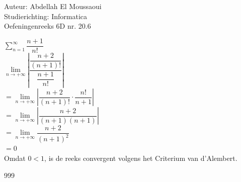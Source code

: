 \documentclass[a4paper]{article}
\begin{document}
  
\noindent \large Auteur: Abdellah El Moussaoui \\
\noindent \large Studierichting: Informatica\\
\noindent \large Oefeningenreeks 6D nr. 20.6\\

\medskip

\normalsize


$\displaystyle\sum_{n=1}^{\infty}\dfrac{n+1}{n!}$\\

$ \lim\limits_{n\to+\infty} \left| \dfrac{\dfrac{n+2}{\left(n+1\right)!}}{\dfrac{n+1}{n!}} \right| $\\

$= \lim\limits_{n\to+\infty} \left| \dfrac{n+2}{\left(n+1\right)!} \cdot \dfrac{n!}{n+1}\right|$\\

$= \lim\limits_{n\to+\infty} \left| \dfrac{n+2}{\left(n+1\right) \left(n+1\right)} \right| $\\

$= \lim\limits_{n\to+\infty} \dfrac{n+2}{\left(n+1\right)^2}$\\

$= 0$\\

Omdat $0 < 1$, is de reeks convergent volgens het Criterium van d'Alembert.\\


\begin{thebibliography}{999}
\end{thebibliography}
\end{document}
